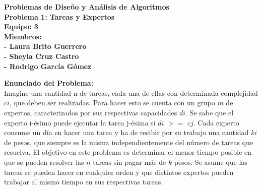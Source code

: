 \documentclass[10pt,letterpaper]{article}
\begin{document}
 	\Large{
 		
 	\begin{center}
 		
 		 {\Huge \bf Problemas de Dise\~no y An\'alisis de Algoritmos}\\
 		 \vspace{1cm}
 		 {\Huge \bf Problema 1: Tareas y Expertos }\\ 
 		 \vspace{1cm}
 		 {\Large \bf Equipo: 3}\\
 		 \vspace{0.5cm}
 		 {\Large \bf Miembros:}\\
 		 {\bf - Laura Brito Guerrero}\\
 		 {\bf - Sheyla Cruz Castro}\\	
 		 {\bf - Rodrigo Garc\'ia G\'omez}\\
 		 
 	\end{center}
 	
 	{\Large \bf Enunciado del Problema:}\\
 	
 	Imagine una cantidad n de tareas, cada una de ellas con determinada complejidad $ci$, que deben ser realizadas. Para hacer esto se cuenta con un grupo $m $ de expertos, caracterizados por sus respectivas capacidades $di$. Se sabe que el experto i-\'esimo puede ejecutar la tarea j-\'esima si $di$ $>=$ $cj$. Cada experto consume un d\'ia en hacer una tarea y ha de recibir por su trabajo una cantidad $ki$ de pesos, que siempre es la misma independientemente del n\'umero de tareas que resuelva. El objetivo en este problema es determinar el menor tiempo posible en que se pueden resolver las $n$ tareas sin pagar m\'as de $k$ pesos. Se asume que las tareas se pueden hacer en cualquier orden y que distintos expertos pueden trabajar al mismo tiempo en sus respectivas tareas.
 	\\ \\
 	
}
\end{document}
